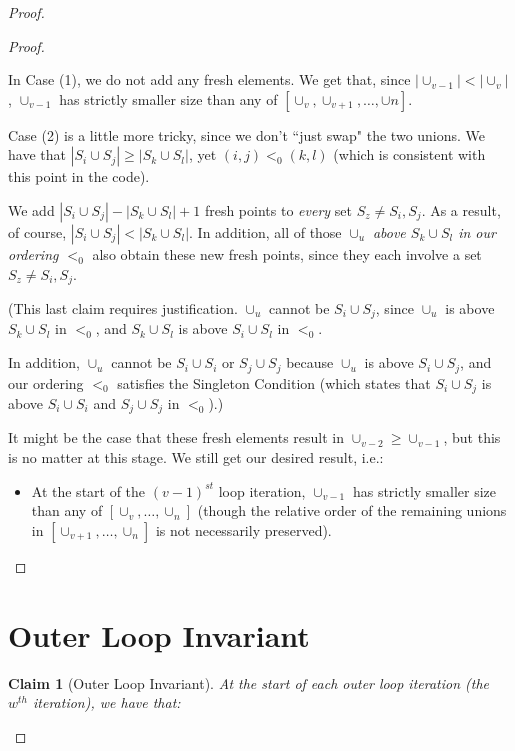 \documentclass[12pt]{article}
\newtheorem{claim}{Claim}
\begin{document}
\begin{proof}
\begin{proof}
\begin{itemize}
In Case (1), we do not add any fresh elements.  We get that, since $|\cup_{v-1}| < |\cup_{v}|$, $\cup_{v-1}$ has strictly smaller size than any of $[\cup_{v}, \cup_{v+1}, \ldots, \cup{n}]$.%

Case (2) is a little more tricky, since we don't ``just swap" the two unions.  We have that $|S_i \cup S_j| \ge |S_k \cup S_l|$, yet $(i, j) <_0 (k, l)$ (which is consistent with this point in the code).

We add $|S_i \cup S_j| - |S_k \cup S_l| + 1$ fresh points to \textit{every} set $S_z \ne S_i, S_j$.  As a result, of course, $|S_i \cup S_j| < |S_k \cup S_l|$.  In addition, all of those $\cup_u$ \textit{above $S_k \cup S_l$ in our ordering $<_0$} also obtain these new fresh points, since they each involve a set $S_z \ne S_i, S_j$.  

(This last claim requires justification.  $\cup_u$ cannot be $S_i \cup S_j$, since $\cup_u$ is above $S_k \cup S_l$ in $<_0$, and $S_k \cup S_l$ is above $S_i \cup S_l$ in $<_0$.

In addition, $\cup_u$ cannot be $S_i \cup S_i$ or $S_j \cup S_j$ because $\cup_u$ is above $S_i \cup S_j$, and our ordering $<_0$ satisfies the Singleton Condition (which states that $S_i \cup S_j$ is above $S_i \cup S_i$ and $S_j \cup S_j$ in $<_0$).)

It might be the case that these fresh elements result in $\cup_{v-2} \ge \cup_{v-1}$, but this is no matter at this stage.  We still get our desired result, i.e.:

\begin{itemize}
    \item At the start of the $(v-1)^{st}$ loop iteration, $\cup_{v-1}$ has strictly smaller size than any of $[\cup_v, \ldots, \cup_n]$   (though the relative order of the remaining unions in $[\cup_{v+1}, \ldots, \cup_n]$ is not necessarily preserved).
\end{itemize}

\end{itemize}

\end{proof}

\section{Outer Loop Invariant}


\begin{claim}[Outer Loop Invariant]
At the start of each outer loop iteration (the $w^{th}$ iteration), we have that:


\end{claim}
\end{proof}
\end{document}
